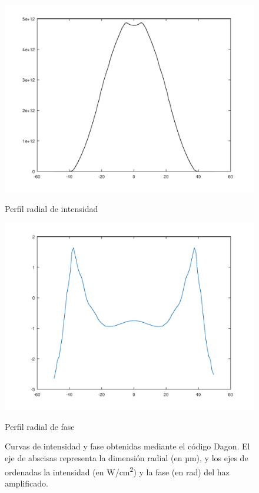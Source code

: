 \begin{figure}[htbp]
  \centering
  \begin{subcaptionblock}{.4\textwidth}
    \centering
    \includegraphics[width=\textwidth]{Figuras/ch2_intens.png}
    \caption{Perfil radial de intensidad}\label{fig:ch2_intensidad}
  \end{subcaptionblock}
  \begin{subcaptionblock}{.4\textwidth}
    \centering
    \includegraphics[width=\textwidth]{Figuras/ch2_fase.png}
    \caption{Perfil radial de fase}\label{fig:ch2_fase}
  \end{subcaptionblock}
  \caption{Curvas de intensidad y fase obtenidas mediante el código Dagon. El eje de abscisas representa la dimensión radial (en \unit{µm}), y los ejes de ordenadas la intensidad (en \unit{W/cm^{2}}) y la fase (en \unit{rad}) del haz amplificado.} 
  \label{fig:2.1}
\end{figure}

